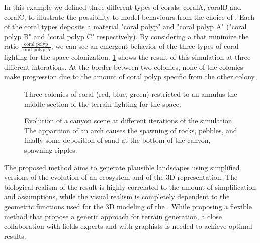 In this example we defined three different types of corals, coralA, coralB and coralC, to illustrate the possibility to model behaviours from the choice of . Each of the coral types deposits a material "coral polyp" and "coral polyp A" ("coral polyp B" and "coral polyp C" respectively). By considering a  that minimize the ratio $\frac{\text{coral polyp}}{\text{coral polyp A}}$, we can see an emergent behavior of the three types of coral fighting for the space colonization.
\cref{fig:env-obj_coral-colonization-scene} shows the result of this simulation at three different interations. At the border between two colonies, none of the colonies make progression due to the amount of coral polyp specific from the other colony.

\begin{figure}
    \caption{Three colonies of coral (red, blue, green) restricted to an annulus the middle section of the terrain fighting for the space.}
    \label{fig:env-obj_coral-colonization-scene}
\end{figure}

\begin{figure}
    \caption{Evolution of a canyon scene at different iterations of the simulation. The apparition of an arch causes the spawning of rocks, pebbles, and finally some deposition of sand at the bottom of the canyon, spawning ripples. }
    \label{fig:env-obj_canyon-scene}
\end{figure}


The proposed method aims to generate plausible landscapes using simplified versions of the evolution of an ecosystem and of the 3D representation. The biological realism of the result is highly correlated to the amount of simplification and assumptions, while the visual realism is completely dependent to the geometric functions used for the 3D modeling of the . While proposing a flexible method that propose a generic approach for terrain generation, a close collaboration with fields experts and with graphists is needed to achieve optimal results.

